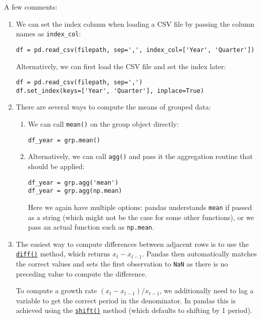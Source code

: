 \documentclass{scrartcl}
\begin{document}
    \begin{center}
    \end{center}
    
    A few comments:

\begin{enumerate}
\def\labelenumi{\arabic{enumi}.}
\item
  We can set the index column when loading a CSV file by passing the
  column names as \texttt{index\_col}:

\begin{verbatim}
df = pd.read_csv(filepath, sep=',', index_col=['Year', 'Quarter'])
\end{verbatim}

  Alternatively, we can first load the CSV file and set the index later:

\begin{verbatim}
df = pd.read_csv(filepath, sep=',')
df.set_index(keys=['Year', 'Quarter'], inplace=True)
\end{verbatim}
\item
  There are several ways to compute the means of grouped data:

  \begin{enumerate}
  \def\labelenumii{\arabic{enumii}.}
  \item
    We can call \texttt{mean()} on the group object directly:

\begin{verbatim}
df_year = grp.mean()
\end{verbatim}
  \item
    Alternatively, we can call \texttt{agg()} and pass it the
    aggregation routine that should be applied:

\begin{verbatim}
df_year = grp.agg('mean')
df_year = grp.agg(np.mean)
\end{verbatim}

    Here we again have multiple options: pandas understands
    \texttt{\textquotesingle{}mean\textquotesingle{}} if passed as a
    string (which might not be the case for some other functions), or we
    pass an actual function such as \texttt{np.mean}.
  \end{enumerate}
\item
  The easiest way to compute differences between adjacent rows is to use
  the
  \href{https://pandas.pydata.org/pandas-docs/stable/reference/api/pandas.DataFrame.diff.html}{\texttt{diff()}}
  method, which returns \(x_t - x_{t-1}\). Pandas then automatically
  matches the correct values and sets the first observation to
  \texttt{NaN} as there is no preceding value to compute the difference.

  To compute a growth rate \((x_t - x_{t-1})/x_{t-1}\), we additionally
  need to lag a variable to get the correct period in the denominator.
  In pandas this is achieved using the
  \href{https://pandas.pydata.org/pandas-docs/stable/reference/api/pandas.DataFrame.shift.html}{\texttt{shift()}}
  method (which defaults to shifting by 1 period).
\end{enumerate}
\end{document}
